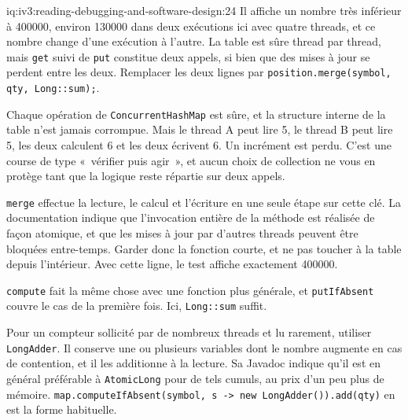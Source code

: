 \begin{solution}{iq:iv3:reading-debugging-and-software-design:24}
Il affiche un nombre très inférieur à 400000, environ 130000 dans deux exécutions ici avec quatre threads, et ce nombre change d'une exécution à l'autre. La table est sûre thread par thread, mais \texttt{get} suivi de \texttt{put} constitue deux appels, si bien que des mises à jour se perdent entre les deux. Remplacer les deux lignes par \texttt{position.merge(symbol, qty, Long::sum);}.

Chaque opération de \texttt{ConcurrentHashMap} est sûre, et la structure interne de la table n'est jamais corrompue. Mais le thread A peut lire 5, le thread B peut lire 5, les deux calculent 6 et les deux écrivent 6. Un incrément est perdu. C'est une course de type «~vérifier puis agir~», et aucun choix de collection ne vous en protège tant que la logique reste répartie sur deux appels.

\texttt{merge} effectue la lecture, le calcul et l'écriture en une seule étape sur cette clé. La documentation indique que l'invocation entière de la méthode est réalisée de façon atomique, et que les mises à jour par d'autres threads peuvent être bloquées entre-temps. Garder donc la fonction courte, et ne pas toucher à la table depuis l'intérieur. Avec cette ligne, le test affiche exactement 400000.

\texttt{compute} fait la même chose avec une fonction plus générale, et \texttt{putIfAbsent} couvre le cas de la première fois. Ici, \texttt{Long::sum} suffit.

Pour un compteur sollicité par de nombreux threads et lu rarement, utiliser \texttt{LongAdder}. Il conserve une ou plusieurs variables dont le nombre augmente en cas de contention, et il les additionne à la lecture. Sa Javadoc indique qu'il est en général préférable à \texttt{AtomicLong} pour de tels cumuls, au prix d'un peu plus de mémoire. \texttt{map.computeIfAbsent(symbol, s -> new LongAdder()).add(qty)} en est la forme habituelle.


\end{solution}

